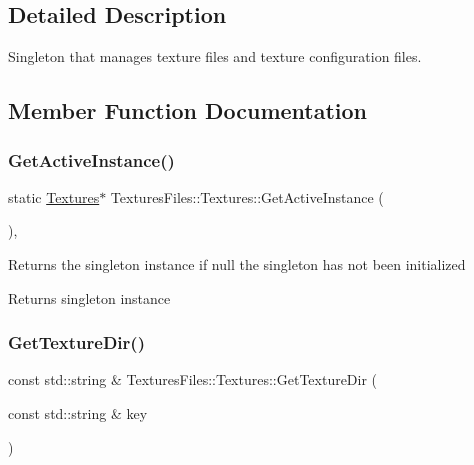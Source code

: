 \subsection{Detailed Description}
Singleton that manages texture files and texture configuration files. 

\subsection{Member Function Documentation}
\mbox{\label{class_textures_files_1_1_textures_a32625c0cb26cc63df0b62b2be30994fd}} 
\subsubsection{\texorpdfstring{GetActiveInstance()}{GetActiveInstance()}}
{\footnotesize\ttfamily static \mbox{\hyperlink{class_textures_files_1_1_textures}{Textures}}$\ast$ Textures\+Files\+::\+Textures\+::\+Get\+Active\+Instance (\begin{DoxyParamCaption}{ }\end{DoxyParamCaption})\hspace{0.3cm}{\ttfamily [inline]}, {\ttfamily [static]}}

Returns the singleton instance if null the singleton has not been initialized \begin{DoxyReturn}{Returns}
singleton instance 
\end{DoxyReturn}
\mbox{\label{class_textures_files_1_1_textures_ae484783c9a26a493e649cc5ccff166de}} 
\subsubsection{\texorpdfstring{GetTextureDir()}{GetTextureDir()}}
{\footnotesize\ttfamily const std\+::string \& Textures\+Files\+::\+Textures\+::\+Get\+Texture\+Dir (\begin{DoxyParamCaption}\item[{const std\+::string \&}]{key }\end{DoxyParamCaption})}

